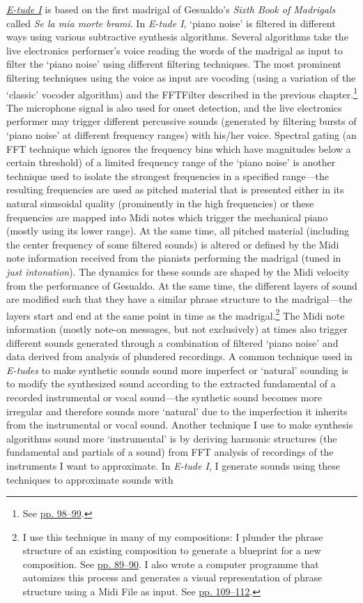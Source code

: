 \href{http://www.federicoreuben.com/media/audio/mp3/CompositionsPhD/01%20E-tude%20I.mp3}{\emph{E-tude I}} is based on the first madrigal of Gesualdo's \emph{Sixth Book of Madrigals} called \emph{Se la mia morte brami}. In \emph{E-tude I}, `piano noise' is filtered in different ways using various subtractive synthesis algorithms. Several algorithms take the live electronics performer's voice reading the words of the madrigal as input to filter the `piano noise' using different filtering techniques. The most prominent filtering techniques using the voice as input are vocoding (using a variation of the `classic' vocoder algorithm) and the FFTFilter described in the previous chapter.\footnote{See \hyperlink{fftfilter}{pp. 98--99}.} The microphone signal is also used for onset detection, and the live electronics performer may trigger different percussive sounds (generated by filtering bursts of `piano noise' at different frequency ranges) with his/her voice. Spectral gating (an FFT technique which ignores the frequency bins which have magnitudes below a certain threshold) of a limited frequency range of the `piano noise' is another technique used to isolate the strongest frequencies in a specified range---the resulting frequencies are used as pitched material that is presented either in its natural sinusoidal quality (prominently in the high frequencies) or these frequencies are mapped into Midi notes which trigger the mechanical piano (mostly using its lower range). At the same time, all pitched material (including the center frequency of some filtered sounds) is altered or defined by the Midi note information received from the pianists performing the madrigal (tuned in \emph{just intonation}). The dynamics for these sounds are shaped by the Midi velocity from the performance of Gesualdo. At the same time, the different layers of sound are modified such that they have a similar phrase structure to the madrigal---the layers start and end at the same point in time as the madrigal.\footnote{I use this technique in many of my compositions: I plunder the phrase structure of an existing composition to generate a blueprint for a new composition. See \hyperlink{macroplunder}{pp. 89--90}. I also wrote a computer programme that automizes this process and generates a visual representation of phrase structure using a Midi File as input. See \hyperlink{scorevisual}{pp. 109--112}.} The Midi note information (mostly note-on messages, but not exclusively) at times also trigger different sounds generated through a combination of filtered `piano noise' and data derived from analysis of plundered recordings. A common technique used in \emph{E-tudes} to make synthetic sounds sound more imperfect or `natural' sounding is to modify the synthesized sound according to the extracted fundamental of a recorded instrumental or vocal sound---the synthetic sound becomes more irregular and therefore sounds more `natural' due to the imperfection it inherits from the instrumental or vocal sound. Another technique I use to make synthesis algorithms sound more `instrumental' is by deriving harmonic structures (the fundamental and partials of a sound) from FFT analysis of recordings of the instruments I want to approximate. In \emph{E-tude I}, I generate sounds using these techniques to approximate sounds with 